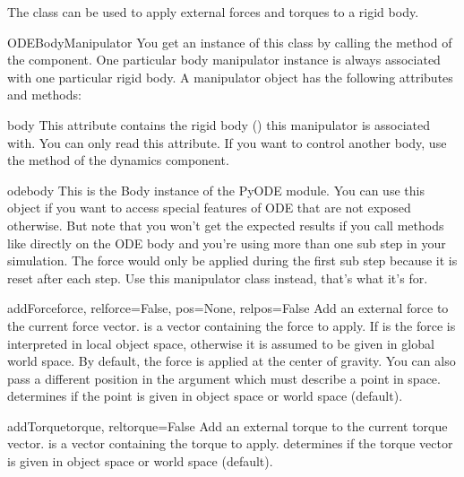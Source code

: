 The  class can be used to apply external
forces and torques to a rigid body. 

\begin{classdesc*}{ODEBodyManipulator}
You get an instance of this class
by calling the
 method of the  component.
One particular body manipulator instance is always associated with one
particular rigid body. A manipulator object has the following attributes
and methods:
\end{classdesc*}

\begin{memberdesc}{body}
This attribute contains the rigid body () this
manipulator is associated with. You can only read this attribute. If
you want to control another body, use the
 method of the dynamics component.
\end{memberdesc}

\begin{memberdesc}{odebody}
This is the Body instance of the PyODE module. You can use this object
if you want to access special features of ODE that are not exposed otherwise.
But note that you won't get the expected results if you call methods like
 directly on the ODE body and you're using more than
one sub step in your simulation. The force would only be applied during
the first sub step because it is reset after each step. Use this
manipulator class instead, that's what it's for.
\end{memberdesc}

\begin{methoddesc}{addForce}{force, relforce=False, pos=None, relpos=False}
Add an external force to the current force vector.  is a vector
containing the force to apply. If  is  the force
is interpreted in local object space, otherwise it is assumed to be given
in global world space. By default, the force is applied at the center
of gravity. You can also pass a different position in the  argument
which must describe a point in space.  determines if the
point is given in object space or world space (default).
\end{methoddesc}

\begin{methoddesc}{addTorque}{torque, reltorque=False}
Add an external torque to the current torque vector.  is
a vector containing the torque to apply.  determines if
the torque vector is given in object space or world space (default).
\end{methoddesc}

